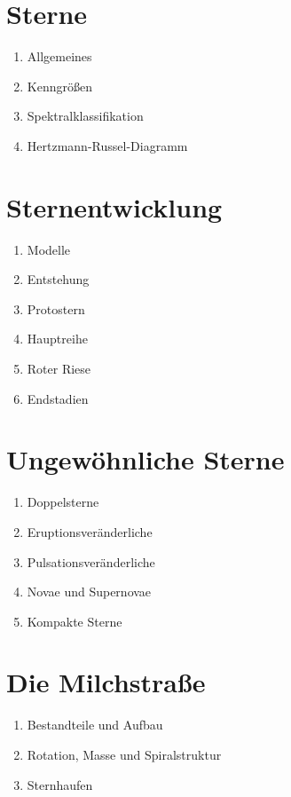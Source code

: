 \documentclass[a4paper,9pt]{article}
\begin{document}
\begin{multicols}{3}
    \section{Sterne} %
    \label{sec:sterne}
      \begin{enumerate}
        \item Allgemeines
        \item Kenngrößen
        \item Spektralklassifikation
        \item Hertzmann-Russel-Diagramm
      \end{enumerate}

    \section{Sternentwicklung} %
    \label{sec:sternentwicklung}
      \begin{enumerate}
        \item Modelle
        \item Entstehung
        \item Protostern
        \item Hauptreihe
        \item Roter Riese
        \item Endstadien
      \end{enumerate}

    \section{Ungewöhnliche Sterne} %
    \label{sec:ungewöhnliche_sterne}
      \begin{enumerate}
        \item Doppelsterne
        \item Eruptionsveränderliche
        \item Pulsationsveränderliche
        \item Novae und Supernovae
        \item Kompakte Sterne
      \end{enumerate}

    \section{Die Milchstraße} %
    \label{sec:die_milchstrasse}
      \begin{enumerate}
        \item Bestandteile und Aufbau
        \item Rotation, Masse und Spiralstruktur
        \item Sternhaufen
      \end{enumerate}


\end{multicols}
\end{document}
